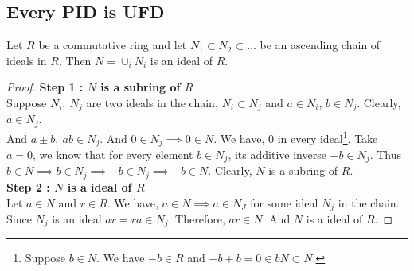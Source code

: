 \subsection{Every PID is UFD}
\begin{lemma}
	Let $R$ be a commutative ring and let $N_1 \subset N_2 \subset \dots $ be an ascending chain of ideals in $R$.
	Then $N = \cup_i N_i$ is an ideal of $R$.
\end{lemma}
\begin{proof}
	\textbf{Step 1 : $N$ is a subring of $R$}\\
	Suppose $N_i,\ N_j$ are two ideals in the chain, $N_i \subset N_j$ and $a \in N_i$, $b \in N_j$.
	Clearly, $a \in N_j$.\\

	And $a \pm b,\ ab \in N_j$.
	And $0 \in N_j \implies 0 \in N$.
	We have, $0$ in every ideal\dag\footnote{
		Suppose $b \in N$.
		We have $-b \in R$ and $-b+b = 0 \in bN \subset N$.}.
	Take $a = 0$, we know that for every element $b \in N_j$, its additive inverse $-b \in N_j$.
	Thus $b \in N \implies b \in N_j \implies -b \in N_j \implies -b \in N$.
	Clearly, $N$ is a subring of $R$.\\
	
	\textbf{Step 2 : $N$ is a ideal of $R$}\\
	Let $a \in N$ and $r \in R$.
	We have, $a \in N \implies a \in N_J$ for some ideal $N_j$ in the chain.
	Since $N_j$ is an ideal $ar = ra \in N_j$.
	Therefore, $ar \in N$.
	And $N$ is a ideal of $R$.
\end{proof}

